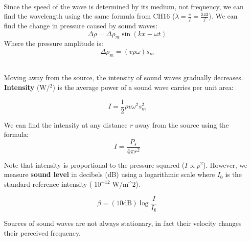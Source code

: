 \documentclass[11pt]{article}
\begin{document}
    \noindent \\ Since the speed of the wave is determined by its medium, not frequency,
    we can find the wavelength using the same formula from CH16 ($\lambda = \frac{v}{f} = \frac{343}{f}$).
    We can find the change in pressure caused by sound waves:
    \begin{equation}
       \Delta \rho = \Delta \rho_m \sin(kx - \omega t)
    \end{equation}
    Where the pressure amplitude is:
    \begin{equation}
     \Delta \rho_m = (v \rho \omega)s_m
    \end{equation}

    \noindent \\ Moving away from the source, the intensity of sound waves gradually decreases.
    \textbf{Intensity} (W/$^{2}$) is the average power of a sound wave carries per unit area:

    \begin{equation}
        I = \frac{1}{2} \rho v \omega^2 s_{m}^2 \tag{intensity}\label{eq:intensity}
    \end{equation}

    \noindent We can find the intensity at any distance $r$ away from the source using the formula:
    \begin{equation}
        I = \frac{P_s}{4 \pi r^2} \tag{intensity at distance r}
    \end{equation}

    \noindent Note that intensity is proportional to the pressure squared
    ($I \propto \rho^2$).
    However, we measure \textbf{sound level} in decibels (dB) using a logarithmic scale
    where $I_0$ is the standard reference intensity ( $10^{-12}$ W/m^2).

    \begin{equation}
        \beta = (10 \text{dB}) \log \frac{I}{I_0} \tag{sound level}
    \end{equation}

    \noindent Sources of sound waves are not always stationary,
    in fact their velocity changes their perceived frequency.
\end{document}
